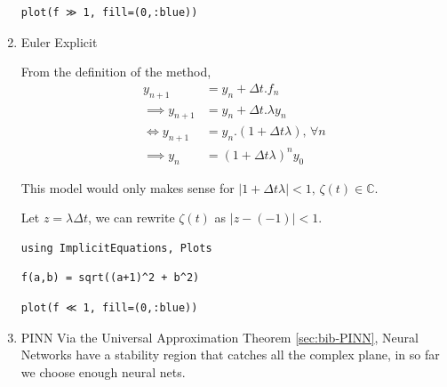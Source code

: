 \documentclass[11pt]{article}
\begin{document}
\begin{enumerate}
\begin{verbatim}
plot(f ≫ 1, fill=(0,:blue))
\end{verbatim}
\item Euler Explicit
\label{sec:org76650d0}

From the definition of the method,
\begin{equation}
\begin{aligned}
y_{n+1}&= y_n + \Delta{t}.f_n\\
\implies y_{n+1} &= y_{n} + \Delta{t}.\lambda{} y_{n}\\
\Leftrightarrow y_{n+1} &= y_{n}.(1+ \Delta{t}\lambda{}), \, \forall{n}\\
\implies y_n &= \left(1+ \Delta{t}\lambda{}\right)^n y_0
\end{aligned}
\end{equation}

This model would only makes sense for \(|1+ \Delta{t} \lambda|<1, \,
\zeta(t) \in \mathbb{C}\).

Let \(z = \lambda{}\Delta{t}\), we can rewrite \(\zeta(t)\) as \(|z -
(-1)|<1\).

\begin{verbatim}
using ImplicitEquations, Plots
\end{verbatim}

\begin{verbatim}
f(a,b) = sqrt((a+1)^2 + b^2)
\end{verbatim}

\begin{verbatim}
plot(f ≪ 1, fill=(0,:blue))
\end{verbatim}
\item PINN
\label{sec:orgb9dd019}
Via the Universal Approximation Theorem \ref{sec:bib-PINN}, Neural Networks have a
stability region that catches all the complex plane, in so far we choose enough
neural nets.
\end{enumerate}
\end{document}
